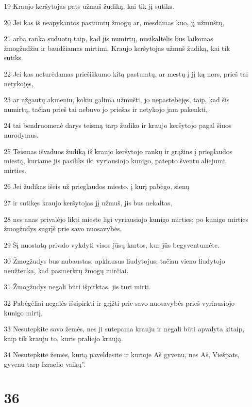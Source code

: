 \par 19 Kraujo keršytojas pats užmuš žudiką, kai tik jį sutiks. 
\par 20 Jei kas iš neapykantos pastumtų žmogų ar, mesdamas kuo, jį užmuštų, 
\par 21 arba ranka suduotų taip, kad jis numirtų, nusikaltėlis bus laikomas žmogžudžiu ir baudžiamas mirtimi. Kraujo keršytojas užmuš žudiką, kai tik sutiks. 
\par 22 Jei kas neturėdamas priešiškumo kitą pastumtų, ar mestų į jį ką nors, prieš tai netykojęs, 
\par 23 ar užgautų akmeniu, kokiu galima užmušti, jo nepastebėjęs, taip, kad šis numirtų, tačiau prieš tai nebuvo jo priešas ir netykojo jam pakenkti, 
\par 24 tai bendruomenė darys teismą tarp žudiko ir kraujo keršytojo pagal šiuos nurodymus. 
\par 25 Teismas išvaduos žudiką iš kraujo keršytojo rankų ir grąžins į prieglaudos miestą, kuriame jis pasiliks iki vyriausiojo kunigo, patepto šventu aliejumi, mirties. 
\par 26 Jei žudikas išeis už prieglaudos miesto, į kurį pabėgo, sienų 
\par 27 ir sutikęs kraujo keršytojas jį užmuš, jis bus nekaltas, 
\par 28 nes anas privalėjo likti mieste ligi vyriausiojo kunigo mirties; po kunigo mirties žmogžudys sugrįš prie savo nuosavybės. 
\par 29 Šį nuostatą privalo vykdyti visos jūsų kartos, kur jūs begyventumėte. 
\par 30 Žmogžudys bus nubaustas, apklausus liudytojus; tačiau vieno liudytojo neužtenka, kad pasmerktų žmogų mirčiai. 
\par 31 Žmogžudys negali būti išpirktas, jis turi mirti. 
\par 32 Pabėgėliai negalės išsipirkti ir grįžti prie savo nuosavybės prieš vyriausiojo kunigo mirtį. 
\par 33 Nesutepkite savo žemės, nes ji sutepama krauju ir negali būti apvalyta kitaip, kaip tik krauju to, kuris praliejo kraują. 
\par 34 Nesutepkite žemės, kurią paveldėsite ir kurioje Aš gyvenu, nes Aš, Viešpats, gyvenu tarp Izraelio vaikų”.



\chapter{36}


